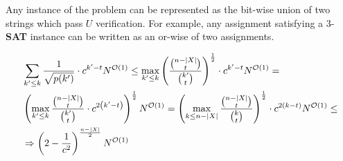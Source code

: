 \documentclass[manuscript,screen,review]{acmart}
\begin{document}
Any instance of the problem can be represented as the bit-wise union of two strings which pass $U$ verification. For example, any assignment satisfying a  $3$-\textbf{SAT} instance can be written as an or-wise of two assignments.


\begin{equation*}
  \begin{split}    
    & \sum_{k' \leq k}   \frac{1}{ \sqrt{ p(k') } } \cdot c^{k'-t} N^{{\mathcal{O}}(1)} \leq  \max_{k' \leq k} \left( \frac{{n - |X| \choose t}}{{k' \choose t}} \right)^{\frac{1}{2}} \cdot c^{k'-t} N^{{\mathcal{O}}(1)} = \\ 
    & \left( \max_{k' \leq k} \frac{{n - |X| \choose t}}{{k' \choose t}}  \cdot c^{2 \left( k'-t \right) } \right)^{\frac{1}{2}} N^{{\mathcal{O}}(1) } =  \left( \max_{k \leq n-|X|} \frac{{n - |X| \choose t}}{{k \choose t}} \right)^{\frac{1}{2}} \cdot c^{ 2 \left(  k-t \right) } N^{{\mathcal{O}}(1)} \le \\ 
    & \Rightarrow  \left(2-\frac{1}{c^{2}}\right)^{ \frac{ n-|X|}{2} }N^{{\mathcal{O}}(1)}
  \end{split}
\end{equation*}


\end{document}
